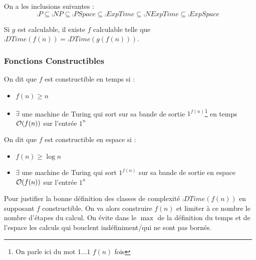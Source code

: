 \documentclass{cours}
\begin{document}
\begin{proposition}
    On a les inclusions suivantes : 
    \[
        \comp{P} \subseteq \comp{NP} \subseteq \comp{PSpace} \subseteq \comp{ExpTime} \subseteq \comp{NExpTime} \subseteq \comp{ExpSpace}
    \]
\end{proposition}

\begin{proposition}
    Si $g$ est calculable, il existe $f$ calculable telle que $\comp{DTime}(f(n)) = \comp{DTime}(g(f(n)))$.
\end{proposition}

\subsubsection{Fonctions Constructibles}
\begin{definition}
    On dit que $f$ est constructible en temps si : 
    \begin{itemize}
        \item $f(n) \geq n$
        \item $\exists$ une machine de Turing qui sort sur sa bande de sortie $1^{f(n)}$\footnote{On parle ici du mot $1\ldots 1$ $f(n)$ fois} en temps $\mathcal{O}(f(n))$ sur l'entrée $1^{n}$
    \end{itemize}
    On dit que $f$ est constructible en espace si :
    \begin{itemize}
        \item $f(n) \geq \log n$
        \item $\exists$ une machine de Turing qui sort $1^{f(n)}$ sur sa bande de sortie en espace $\mathcal{O}(f(n))$ sur l'entrée $1^{n}$
    \end{itemize}
\end{definition}

Pour justifier la bonne définition des classes de complexité $\comp{DTime}(f(n))$ en supposant $f$ constructible. On va alors construire $f(n)$ et limiter à ce nombre le nombre d'étapes du calcul. On évite dans le $\max$ de la définition du temps et de l'espace les calculs qui bouclent indéfiniment/qui ne sont pas bornés.
\end{document}
